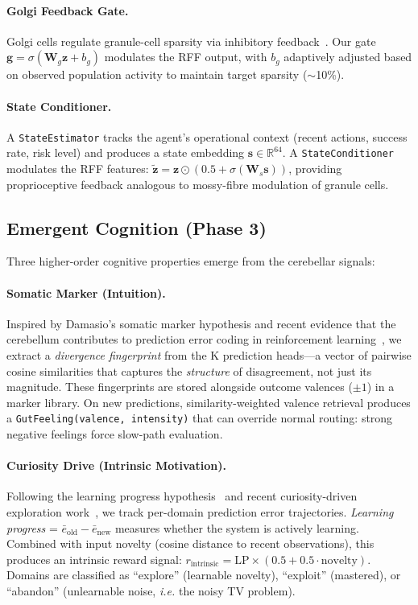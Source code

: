 \documentclass[11pt,a4paper]{article}
\newcommand{\ie}{\textit{i.e.}}
\newcommand{\R}{\mathbb{R}}
\begin{document}
\paragraph{Golgi Feedback Gate.}
Golgi cells regulate granule-cell sparsity via inhibitory feedback~\citep{marr1969theory,albus1971theory}.
Our gate $\mathbf{g} = \sigma(\mathbf{W}_g \mathbf{z} + b_g)$ modulates the RFF output, with $b_g$ adaptively adjusted based on observed population activity to maintain target sparsity ($\sim$10\%).

\paragraph{State Conditioner.}
A \texttt{StateEstimator} tracks the agent's operational context (recent actions, success rate, risk level) and produces a state embedding $\mathbf{s} \in \R^{64}$.
A \texttt{StateConditioner} modulates the RFF features: $\tilde{\mathbf{z}} = \mathbf{z} \odot (0.5 + \sigma(\mathbf{W}_s \mathbf{s}))$, providing proprioceptive feedback analogous to mossy-fibre modulation of granule cells.

\subsection{Emergent Cognition (Phase 3)}\label{sec:phase3}

Three higher-order cognitive properties emerge from the cerebellar signals:

\paragraph{Somatic Marker (Intuition).}
Inspired by Damasio's somatic marker hypothesis and recent evidence that the cerebellum contributes to prediction error coding in reinforcement learning~\citep{heffley2018cerebellum}, we extract a \emph{divergence fingerprint} from the K prediction heads---a vector of pairwise cosine similarities that captures the \emph{structure} of disagreement, not just its magnitude.
These fingerprints are stored alongside outcome valences ($\pm 1$) in a marker library.
On new predictions, similarity-weighted valence retrieval produces a \texttt{GutFeeling(valence, intensity)} that can override normal routing: strong negative feelings force slow-path evaluation.

\paragraph{Curiosity Drive (Intrinsic Motivation).}
Following the learning progress hypothesis~\citep{schmidhuber1991curious} and recent curiosity-driven exploration work~\citep{pathak2017curiosity}, we track per-domain prediction error trajectories.
\emph{Learning progress} = $\bar{e}_{\text{old}} - \bar{e}_{\text{new}}$ measures whether the system is actively learning.
Combined with input novelty (cosine distance to recent observations), this produces an intrinsic reward signal:
$r_{\text{intrinsic}} = \text{LP} \times (0.5 + 0.5 \cdot \text{novelty})$.
Domains are classified as ``explore'' (learnable novelty), ``exploit'' (mastered), or ``abandon'' (unlearnable noise, \ie{} the noisy TV problem).
\end{document}
